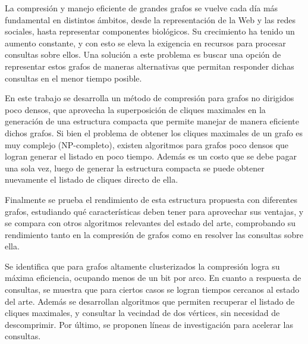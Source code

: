 La compresión y manejo eficiente de grandes grafos se vuelve cada día más fundamental en distintos ámbitos, desde la representación de la Web y las redes sociales, hasta representar componentes biológicos. Su crecimiento ha tenido un aumento constante, y con esto se eleva la exigencia en recursos para procesar consultas sobre ellos. Una solución a este problema es buscar una opción de representar estos grafos de maneras alternativas que permitan responder dichas consultas en el menor tiempo posible.

En este trabajo se desarrolla un método de compresión para grafos no dirigidos poco densos, que aprovecha la superposición de cliques maximales en la generación de una estructura compacta que permite manejar de manera eficiente dichos grafos. Si bien el problema de obtener los cliques maximales de un grafo es muy complejo (NP-completo), existen algoritmos para grafos poco densos que logran generar el listado en poco tiempo. Además es un costo que se debe pagar una sola vez, luego de generar la estructura compacta se puede obtener nuevamente el listado de cliques directo de ella.

Finalmente se prueba el rendimiento de esta estructura propuesta con diferentes grafos, estudiando qué características deben tener para aprovechar sus ventajas, y se compara con otros algoritmos relevantes del estado del arte, comprobando su rendimiento tanto en la compresión de grafos como en resolver las consultas sobre ella.

Se identifica que para grafos altamente clusterizados la compresión logra su máxima eficiencia, ocupando menos de un bit por arco. En cuanto a respuesta de consultas, se muestra que para ciertos casos se logran tiempos cercanos al estado del arte. Además se desarrollan algoritmos que permiten recuperar el listado de cliques maximales, y consultar la vecindad de dos vértices, sin necesidad de descomprimir. Por último, se proponen líneas de investigación para acelerar las consultas.
